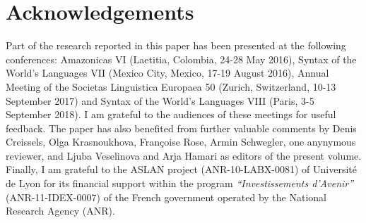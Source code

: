 \documentclass[output=paper]{langsci/langscibook}
\begin{document}
\section*{Acknowledgements}
Part of the research reported in this paper has been presented at the following conferences: Amazonicas VI (Laetitia, Colombia, 24-28 May 2016), Syntax of the World’s Languages VII (Mexico City, Mexico, 17-19 August 2016), Annual Meeting of the Societas Linguistica Europaea 50 (Zurich, Switzerland, 10-13 September 2017) and Syntax of the World's Languages VIII (Paris, 3-5 September 2018). I am grateful to the audiences of these meetings for useful feedback. The paper has also benefited from further valuable comments by Denis Creissels, Olga Krasnoukhova, Françoise Rose, Armin Schwegler, one anynymous reviewer, and Ljuba Veselinova and Arja Hamari as editors of the present volume. Finally, I am grateful to the ASLAN project (ANR-10-LABX-0081) of Université de Lyon for its financial support within the program \textit{“Investissements d'Avenir”} (ANR-11-IDEX-0007) of the French government operated by the National Research Agency (ANR).

{\sloppy\printbibliography[heading=subbibliography,notkeyword=this]}
\end{document}
